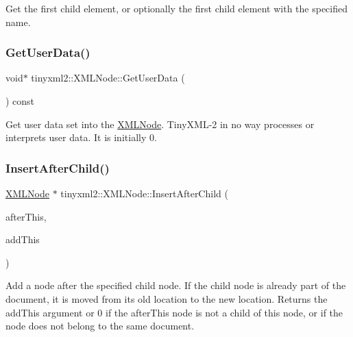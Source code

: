 Get the first child element, or optionally the first child element with the specified name. \mbox{\label{classtinyxml2_1_1_x_m_l_node_a7f0687574afa03bc479dc44f29db0afe}} 
\subsubsection{\texorpdfstring{Get\+User\+Data()}{GetUserData()}}
{\footnotesize\ttfamily void$\ast$ tinyxml2\+::\+X\+M\+L\+Node\+::\+Get\+User\+Data (\begin{DoxyParamCaption}{ }\end{DoxyParamCaption}) const\hspace{0.3cm}{\ttfamily [inline]}}

Get user data set into the \hyperlink{classtinyxml2_1_1_x_m_l_node}{X\+M\+L\+Node}. Tiny\+X\+M\+L-\/2 in no way processes or interprets user data. It is initially 0. \mbox{\label{classtinyxml2_1_1_x_m_l_node_a9275138a1b8dd5d8e2c26789bdc23ac8}} 
\subsubsection{\texorpdfstring{Insert\+After\+Child()}{InsertAfterChild()}}
{\footnotesize\ttfamily \hyperlink{classtinyxml2_1_1_x_m_l_node}{X\+M\+L\+Node} $\ast$ tinyxml2\+::\+X\+M\+L\+Node\+::\+Insert\+After\+Child (\begin{DoxyParamCaption}\item[{\hyperlink{classtinyxml2_1_1_x_m_l_node}{X\+M\+L\+Node} $\ast$}]{after\+This,  }\item[{\hyperlink{classtinyxml2_1_1_x_m_l_node}{X\+M\+L\+Node} $\ast$}]{add\+This }\end{DoxyParamCaption})}

Add a node after the specified child node. If the child node is already part of the document, it is moved from its old location to the new location. Returns the add\+This argument or 0 if the after\+This node is not a child of this node, or if the node does not belong to the same document. \mbox{\label{classtinyxml2_1_1_x_m_l_node_ae3b422e98914d6002ca99bb1d2837103}} 
